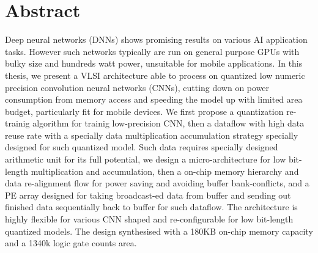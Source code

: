 \chapter{Abstract}
\label{ch:abstract}
Deep neural networks (DNNs) shows promising results on various AI application tasks. However such networks typically are run on general purpose GPUs with bulky size and hundreds watt power, unsuitable for mobile applications. In this thesis, we present a VLSI architecture able to process on quantized low numeric precision convolution neural networks (CNNs), cutting down on power consumption from memory access and speeding the model up with limited area budget, particularly fit for mobile devices. We first propose a quantization re-trainig algorithm for trainig low-precision CNN, then a dataflow with high data reuse rate with a specially data multiplication accumulation strategy specially designed for such quantized model. Such data requires specially designed arithmetic unit for its full potential, we design a micro-architecture for low bit-length multiplication and accumulation, then a on-chip memory hierarchy and data re-alignment flow for power saving and avoiding buffer bank-conflicts, and a PE array designed for taking broadcast-ed data from buffer and sending out finished data sequentially back to buffer for such dataflow. The architecture is highly flexible for various CNN shaped and re-configurable for low bit-length quantized models. The design synthesised with a 180KB on-chip memory capacity and a 1340k logic gate counts area.